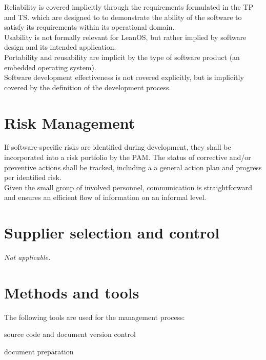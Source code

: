 \noindent
Reliability is covered implicitly through the requirements formulated in the
\gls{TP}\cite{leanosTP} and \gls{TS}\cite{leanosTS}. which are designed to
to demonstrate the ability of the software to satisfy its requirements within
its operational domain.\\

\noindent
Usability is not formally relevant for LeanOS, but rather implied by software
design and its intended application.\\

\noindent
Portability and reusability are implicit by the type of software product
(an embedded operating system).\\

\noindent
Software development effectiveness is not covered explicitly, but is implicitly
covered by the definition of the development process.


\section{Risk Management}

If software-specific risks are identified during development, they shall be
incorporated into a risk portfolio by the \gls{PAM}. The status of corrective
and/or preventive actions shall be tracked, including a a general action plan
and progress per identified risk.\\

\noindent
Given the small group of involved personnel, communication is straightforward
and ensures an efficient flow of information on an informal level.


\section{Supplier selection and control}

\emph{Not applicable.}


\section{Methods and tools}

The following tools are used for the management process:

\begin{description}[labelwidth=4em,leftmargin=\parindent,labelindent=\parindent]
	\item[\textbf{git}]		source code and document version control
	\item[\textbf{TeX Live}]	document preparation
\end{description}


